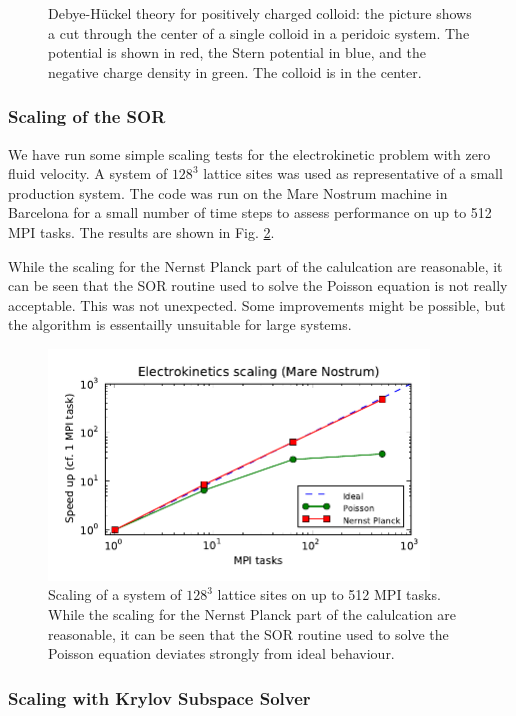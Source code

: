 \begin{figure}[htpb]
\caption{Debye-H\"uckel theory for positively charged colloid: the picture
shows a cut through the center of a single colloid in a peridoic system.
The potential is shown in red, the Stern potential in blue, and the negative 
charge density in green. The colloid is in the center.}
\label{fig7}
\end{figure}
\clearpage

\subsubsection{Scaling of the SOR}

We have run some simple scaling tests for the electrokinetic problem
with zero fluid velocity. A system of $128^3$ lattice sites was used
as representative of a small production system. The code was run on
the Mare Nostrum machine in Barcelona for a small number of time
steps to assess performance on up to 512 MPI tasks. The results are
shown in Fig. \ref{fig5}. 

While the scaling for the Nernst Planck part of
the calulcation are reasonable, it can be seen that the SOR routine
used to solve the Poisson equation is not really acceptable. This
was not unexpected. Some improvements might be possible, but the
algorithm is essentailly unsuitable for large systems. 

\begin{figure}[htpb]
\includegraphics[width=0.9\textwidth]{./pics/scaling.pdf}
\caption{Scaling of a system of $128^3$ lattice sites on up to 512 MPI tasks. 
While the scaling for the Nernst Planck part of the calulcation are reasonable, 
it can be seen that the SOR routine used to solve the Poisson equation deviates
strongly from ideal behaviour.} 
\label{fig5} 
\end{figure}

\subsubsection{Scaling with Krylov Subspace Solver}

